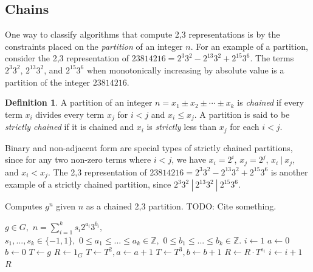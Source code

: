 \documentclass{ucalgthes1}
\theoremstyle{plain}
\theoremstyle{definition}
\newtheorem{defn}[thm]{Definition}
\newcommand{\ZZ}{\mathbb{Z}}
\begin{document}
\bigbreak
\subsection{Chains}

One way to classify algorithms that compute 2,3 representations is by the constraints placed on the \emph{partition} of an integer $n$.  For an example of a partition, consider the 2,3 representation of $23814216 = 2^3 3^2 -2^{13} 3^2 +2^{15} 3^6$.  The terms $2^3 3^2$, $2^{13} 3^2$, and $2^{15} 3^6$ when monotonically increasing by absolute value is a partition of the integer $23814216$.  

\begin{defn}
A partition of an integer $n = x_1 \pm x_2 \pm \cdots \pm x_k$ is \emph{chained} if every term $x_i$ divides every term $x_j$ for $i < j$ and $x_i \le x_j$. A partition is said to be \emph{strictly chained} if it is chained and $x_i$ is \emph{strictly} less than $x_j$ for each $i < j$.
\end{defn}

\noindent
Binary and non-adjacent form are special types of strictly chained partitions, since for any two non-zero terms where $i < j$, we have $x_i = 2^i$, $x_j = 2^j$, $ x_i ~|~ x_j$, and $x_i < x_j$.  The 2,3 representation of $23814216 = 2^3 3^2 - 2^{13} 3^2 + 2^{15} 3^6$ is another example of a strictly chained partition, since $2^3 3^2 ~|~ 2^{13} 3^2 ~|~ 2^{15} 3^6$.

\begin{algorithm}[h]
\caption{Computes $g^n$ given $n$ as a chained 2,3 partition. TODO: Cite something.}
\label{alg:expWithChain}
\begin{algorithmic}[1]
\REQUIRE $g \in G,$ 
$n = \sum_{i=1}^k s_i2^{a_i}3^{b_i},$ \\
$s_1,...,s_k \in \{-1, 1\},$ 
$0 \le a_1 \le ...\le a_k \in \ZZ,$ 
$0 \le b_1 \le ... \le b_k \in \ZZ.$
\STATE $i \gets 1$
\STATE $a \gets 0$ 
\STATE $b \gets 0$ 
\STATE $T \gets g$ 
\STATE $R \gets 1_G$
		\STATE $T \gets T^2, a \gets a + 1$
	\ENDWHILE
		\STATE $T \gets T^3, b \gets b + 1$
	\ENDWHILE
	\STATE $R \gets R \cdot T^{s_i}$ 
	\STATE $i \gets i + 1$
\ENDWHILE
\RETURN $R$
\end{algorithmic}
\end{algorithm}
\end{document}
